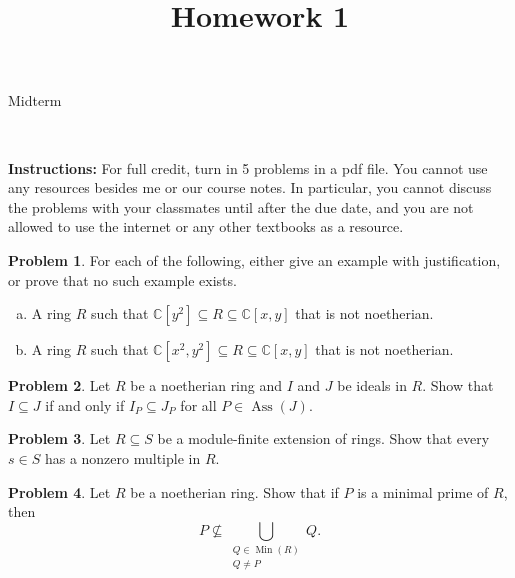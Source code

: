 \documentclass[11pt]{article}
\title{}
\date{\vspace{-0.5in}}
\title{Homework 1}
\DeclareMathOperator{\Ass}{Ass}
\DeclareMathOperator{\Min}{Min}
\theoremstyle{definition}
\newtheorem{problem}{Problem}
\begin{document}
\thispagestyle{fancy}
\pagestyle{fancy}

\vspace{3em}

\begin{center}
	{\LARGE Midterm}
\end{center}

\

\noindent
{\bf Instructions:}
For full credit, turn in 5 problems in a pdf file. 
You cannot use any resources besides me or our course notes. In particular, you cannot discuss the problems with your classmates until after the due date, and you are not allowed to use the internet or any other textbooks as a resource.


\vspace{2em}



\begin{problem}
	For each of the following, either give an example with justification, or prove that no such example exists.
	\begin{enumerate}[a)]
		\item A ring $R$ such that $\mathbb{C}[y^2] \subseteq R \subseteq \mathbb{C}[x,y]$ that is not noetherian.
		\item A ring $R$ such that $\mathbb{C}[x^2,y^2] \subseteq R \subseteq \mathbb{C}[x,y]$ that is not noetherian.
	\end{enumerate}
\end{problem}


\vfill

\begin{problem}
	Let $R$ be a noetherian ring and $I$ and $J$ be ideals in $R$. Show that $I \subseteq J$ if and only if $I_P \subseteq J_P$ for all $P \in \Ass(J)$.
\end{problem}


\vfill

\begin{problem}
	Let $R \subseteq S$ be a module-finite extension of rings. Show that every $s \in S$ has a nonzero multiple in $R$.
\end{problem}



\vfill

\begin{problem}
	Let $R$ be a noetherian ring. Show that if $P$ is a minimal prime of $R$, then
	$$P \nsubseteq \bigcup_{\substack{Q \in \Min(R) \\ Q \neq P}} Q.$$
\end{problem}
\end{document}
